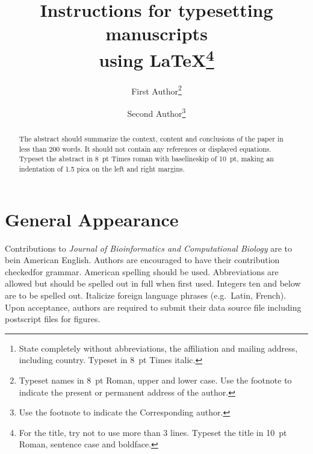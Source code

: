 \documentclass{ws-jbcb}
\begin{document}

%
\catchline{}{}{}{}{}
%

\title{Instructions for typesetting manuscripts\\
using \LaTeX\footnote{For the title, try not to use more than
3 lines. Typeset the title in 10~pt Roman, sentence case and
boldface.}
}

\author{First Author\footnote{Typeset names in 8~pt Roman, upper and lower case. Use the footnote to indicate the present or permanent address of the author.}}

\address{University Department, University Name, Address\\
City, State ZIP/Zone,
Country\footnote{State completely without abbreviations, the
affiliation and mailing address, including country. Typeset in 8~pt
Times italic.}\\
first\_author@university.edu}

\author{Second Author\footnote{Use the footnote to indicate the Corresponding author.}}

\address{Group, Laboratory, Address\\
City, State ZIP/Zone, Country\\
second\_author@group.com}

\maketitle

\begin{history}
\end{history}

\begin{abstract}
The abstract should summarize the context, content
and conclusions of the paper in less than 200 words. It should
not contain any references or displayed equations. Typeset the
abstract in 8~pt Times roman with baselineskip of 10~pt, making
an indentation of 1.5 pica on the left and right margins.
\end{abstract}


\section{General Appearance}
Contributions to {\it Journal of Bioinformatics and Computational
Biology} are to be\break in American English. Authors are encouraged
to have their contribution checked\break for grammar. American spelling
should be used. Abbreviations are allowed but should be spelled out in
full when first used. Integers ten and below are to be spelled out.
Italicize foreign language phrases (e.g.~Latin, French).  Upon
acceptance, authors are required to submit their data source file
including postscript files for figures.
\end{document}
